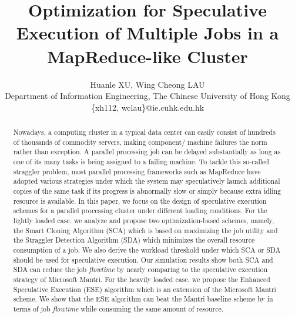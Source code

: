 \documentclass[10pt,conference]{IEEEtran}
\begin{document}
\title{Optimization for Speculative Execution of Multiple Jobs in a MapReduce-like Cluster}

\author{Huanle XU, Wing Cheong LAU \\ Department of Information Engineering, The Chinese University of Hong Kong\\\{xh112, wclau\}@ie.cuhk.edu.hk \\
}

\maketitle

\vspace{-0.5cm}

\begin{abstract}
Nowadays, a computing cluster in a typical data center can easily consist of hundreds of thousands of commodity servers, making component/ machine failures the norm rather than exception. A parallel processing
job can be delayed substantially as long as one of its many tasks is being assigned to a failing machine.
To tackle this so-called straggler problem, most parallel processing frameworks such as MapReduce have adopted various strategies under which the system may speculatively launch additional copies of the same task if its progress is abnormally slow or simply because extra idling resource is available.  In this paper, we focus on the design  of  speculative execution schemes for a parallel processing cluster under different loading conditions.
For the lightly loaded case, we analyze and propose two optimization-based schemes, namely, the Smart Cloning Algorithm (SCA) which is based on maximizing the job utility and the Straggler Detection Algorithm (SDA) which minimizes the overall resource consumption of a job. We also derive the workload threshold under which SCA or SDA should be used for speculative execution. Our simulation results show both SCA and SDA can reduce the job \textit{flowtime} by nearly  comparing to the speculative execution strategy of Microsoft Mantri.
For the heavily loaded case, we propose the Enhanced Speculative Execution (ESE) algorithm which is an extension of the Microsoft Mantri scheme. We show that the ESE algorithm can beat the Mantri baseline scheme by  in terms of job \textit{flowtime} while consuming the same amount of resource.





\end{abstract}
\end{document}
